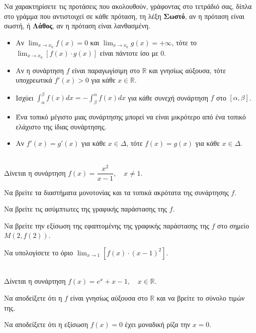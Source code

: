 \documentclass[11pt,a4paper,modern,B]{FFExam}
\begin{document}
\begin{thema}
\begin{erwthma}
\item  Να χαρακτηρίσετε τις προτάσεις που ακολουθούν, γράφοντας στο τετράδιό σας, δίπλα στο γράμμα που αντιστοιχεί σε κάθε πρόταση, τη λέξη \textbf{Σωστό}, αν η πρόταση είναι σωστή, ή \textbf{Λάθος}, αν η πρόταση είναι λανθασμένη.
\begin{itemize}
    \item[(α)] Αν $\lim_{x \to x_0} f(x) = 0$ και $\lim_{x \to x_0} g(x) = +\infty$, τότε το $\lim_{x \to x_0} [f(x) \cdot g(x)]$ είναι πάντοτε ίσο με $0$.
    \item[(β)] Αν η συνάρτηση $f$ είναι παραγωγίσιμη στο $\mathbb{R}$ και γνησίως αύξουσα, τότε υποχρεωτικά $f'(x) > 0$ για κάθε $x \in \mathbb{R}$.
    \item[(γ)] Ισχύει $\int_{\alpha}^{\beta} f(x) dx = -\int_{\beta}^{\alpha} f(x) dx$ για κάθε συνεχή συνάρτηση $f$ στο $[\alpha, \beta]$.
    \item[(δ)] Ένα τοπικό μέγιστο μιας συνάρτησης μπορεί να είναι μικρότερο από ένα τοπικό ελάχιστο της ίδιας συνάρτησης.
    \item[(ε)] Αν $f'(x) = g'(x)$ για κάθε $x \in \Delta$, τότε $f(x) = g(x)$ για κάθε $x \in \Delta$.
\end{itemize}
\end{erwthma}
\item\mbox{}\\
Δίνεται η συνάρτηση $f(x) = \dfrac{x^2}{x-1}, \quad x \neq 1$.
\begin{erwthma}
\item Να βρείτε τα διαστήματα μονοτονίας και τα τοπικά ακρότατα της συνάρτησης $f$.
\item Να βρείτε τις ασύμπτωτες της γραφικής παράστασης της $f$.
\item Να βρείτε την εξίσωση της εφαπτομένης της γραφικής παράστασης της $f$ στο σημείο $M(2, f(2))$.
\item Να υπολογίσετε το όριο $\lim_{x \to 1} [f(x) \cdot (x-1)^2]$.
\end{erwthma}
\item\mbox{}\\
Δίνεται η συνάρτηση $f(x) = e^x + x - 1, \quad x \in \mathbb{R}$.
\begin{erwthma}
\item Να αποδείξετε ότι η $f$ είναι γνησίως αύξουσα στο $\mathbb{R}$ και να βρείτε το σύνολο τιμών της.
\item Να αποδείξετε ότι η εξίσωση $f(x) = 0$ έχει μοναδική ρίζα την $x = 0$.

\end{erwthma}
\end{thema}
\end{document}
